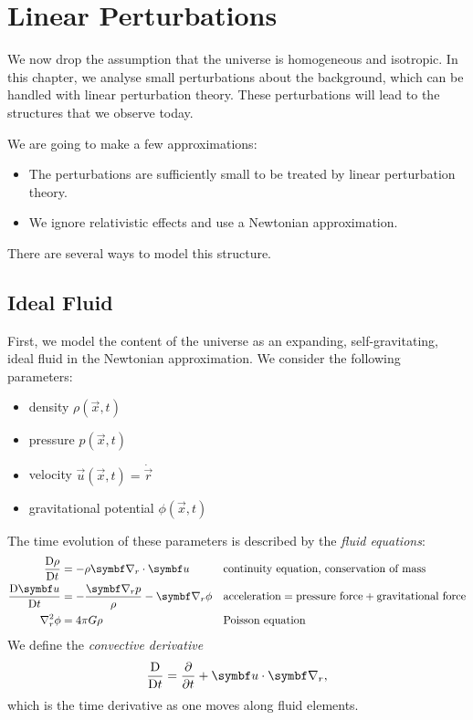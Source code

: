 \chapter{Linear Perturbations}

We now drop the assumption that the universe is homogeneous and isotropic. In this chapter, we analyse small perturbations about the background, which can be handled with linear perturbation theory. These perturbations will lead to the structures that we observe today.

We are going to make a few approximations:
\begin{itemize}
	\item The perturbations are sufficiently small to be treated by linear perturbation theory.
	\item We ignore relativistic effects and use a Newtonian approximation.
\end{itemize}

There are several ways to model this structure.

\section{Ideal Fluid}
First, we model the content of the universe as an expanding, self-gravitating, ideal fluid in the Newtonian approximation. We consider the following parameters:
\begin{itemize}
	\item density $\rho(\vec{x},t)$
	\item pressure $p(\vec{x},t)$
	\item velocity $\vec{u}(\vec{x},t) = \dot{\vec{r}}$
	\item gravitational potential $\phi(\vec{x},t)$
\end{itemize}
The time evolution of these parameters is described by the \emph{fluid equations}:
\begin{align*}
	\Dv{\rho}{t} &= - \rho \Grad_r \cdot \vec{u}
	&& \text{continuity equation, conservation of mass}\\
	\Dv{\vec{u}}{t} &= - \frac{\Grad_r p}{\rho} - \Grad_r \phi
	&&\text{acceleration} = \text{pressure force} + \text{gravitational force}\\
	\Lap_r \phi &= 4 \pi G \rho
	&&\text{Poisson equation}
\end{align*}
We define the \emph{convective derivative}
\begin{align*}
	\Dv{}{t} = \pdv{}{t} + \vec{u} \cdot \Grad_r,
\end{align*}
which is the time derivative as one moves along fluid elements.

